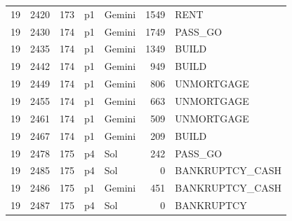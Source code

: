 \begin{longtable}{r r r l l r L{2.2in}}
19 & 2420 & 173 & p1 & Gemini & 1549 & RENT \\
19 & 2430 & 174 & p1 & Gemini & 1749 & PASS\_GO \\
19 & 2435 & 174 & p1 & Gemini & 1349 & BUILD \\
19 & 2442 & 174 & p1 & Gemini & 949 & BUILD \\
19 & 2449 & 174 & p1 & Gemini & 806 & UNMORTGAGE \\
19 & 2455 & 174 & p1 & Gemini & 663 & UNMORTGAGE \\
19 & 2461 & 174 & p1 & Gemini & 509 & UNMORTGAGE \\
19 & 2467 & 174 & p1 & Gemini & 209 & BUILD \\
19 & 2478 & 175 & p4 & Sol & 242 & PASS\_GO \\
19 & 2485 & 175 & p4 & Sol & 0 & BANKRUPTCY\_CASH \\
19 & 2486 & 175 & p1 & Gemini & 451 & BANKRUPTCY\_CASH \\
19 & 2487 & 175 & p4 & Sol & 0 & BANKRUPTCY \\
\end{longtable}
\endgroup
{}
